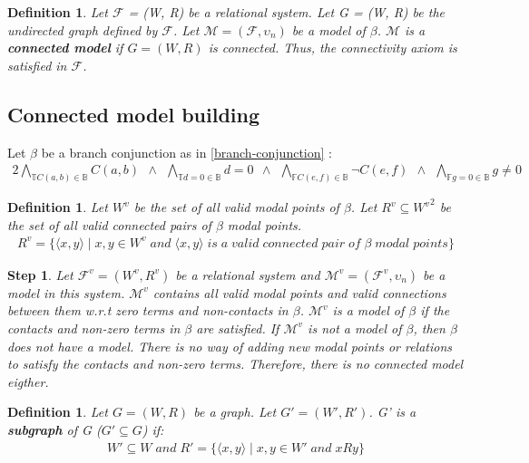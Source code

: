 \documentclass{article}
\newcommand\ST{\mathbb{T}}
\newcommand\SF{\mathbb{F}}
\newcommand\SB{\mathbb{B}}
\newcommand\M{\mathcal{M}}
\newcommand\F{\mathcal{F}}
\newtheorem{defn}[theorem]{Definition}
\newtheorem{step}[theorem]{Step}
\newcommand{\BranchConjunction}{%
\begin{alignat}{2}
			\bigwedge_{\ST C(a,b)\in{\SB}} C(a, b) \:\: \wedge \:\:
			\bigwedge_{\ST d = 0\in{\SB}} d = 0 \:\: \wedge \:\:
			\bigwedge_{\SF C(e,f)\in{\SB}} \neg C(e, f) \:\: \wedge \:\:
			\bigwedge_{\SF g = 0\in{\SB}} g \neq 0
\end{alignat}%
}
\newcommand{\pair}[2]{ \langle #1, #2 \rangle }
\newcommand{\pairXY}{ \pair{x}{y} }
\begin{document}
	\begin{defn}
		Let $\F$ = (W, R) be a relational system. Let G = (W, R) be the undirected graph defined by $\F$. Let $\M = (\F, \upsilon_n)$ be a model of $\beta$. $\M$ is a \textbf{connected model} if $G = (W, R)$ is connected. Thus, the connectivity axiom is satisfied in $\F$.
	\end{defn}

	\subsection{Connected model building}
	\label{connected-model-building}

		Let $\beta$ be a branch conjunction as in \ref{branch-conjunction} :
		\nonumber\BranchConjunction

		\begin{defn}\label{set-all-valid-modal-point-pairs}
			Let $W^v$ be the set of all valid modal points of $\beta$. Let $R^v \subseteq {W^v}^2$ be the set of all valid connected pairs of $\beta$ modal points.
			\begin{align*}
				R^v = \{ \pairXY  \mid x, y \in W^v \; and \; \pairXY \; is \; a \; valid \; connected \; pair \; of \; \beta \; modal \; points\}
			\end{align*}
		\end{defn}

		\begin{step}
			Let $\F^v = (W^v, R^v)$ be a relational system and $\M^v = (\F^v, \upsilon_n)$ be a model in this system. $\M^v$ contains all valid modal points and valid connections between them w.r.t zero terms and non-contacts in $\beta$. $\M^v$ is a model of $\beta$ if the contacts and non-zero terms in $\beta$ are satisfied. If $\M^v$ is not a model of $\beta$, then $\beta$ does not have a model. There is no way of adding new modal points or relations to satisfy the contacts and non-zero terms. Therefore, there is no connected model eigther.
		\end{step}

	\begin{defn}\label{subgraph}
		Let $G=(W, R)$ be a graph. Let $G'=(W', R')$. G' is a \textbf{subgraph} of G ($G' \subseteq G$) if:
		\begin{align*}
			W' \subseteq W \; and \; R' =  \{ \pairXY  \mid x, y \in W' \; and \; xRy  \}
		\end{align*}
	\end{defn}
\end{document}
